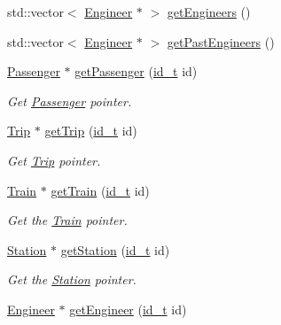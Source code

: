 \begin{DoxyCompactItemize}
std\+::vector$<$ \mbox{\hyperlink{classEngineer}{Engineer}} $\ast$ $>$ \mbox{\hyperlink{classSystem_a7c46ccdf8464941220f87c8c9c2b8920}{get\+Engineers}} ()
\item 
std\+::vector$<$ \mbox{\hyperlink{classEngineer}{Engineer}} $\ast$ $>$ \mbox{\hyperlink{classSystem_a2c7e714df1c7788f724cdfbd9eab3984}{get\+Past\+Engineers}} ()
\item 
\mbox{\hyperlink{classPassenger}{Passenger}} $\ast$ \mbox{\hyperlink{classSystem_a166d21a8b7c87bb6779420b77387fce6}{get\+Passenger}} (\mbox{\hyperlink{project__utils_8h_a8f3a969054ad2200720b96e7e23dd4e1}{id\+\_\+t}} id)
\begin{DoxyCompactList}\small\item\em Get \mbox{\hyperlink{classPassenger}{Passenger}} pointer. \end{DoxyCompactList}\item 
\mbox{\hyperlink{classTrip}{Trip}} $\ast$ \mbox{\hyperlink{classSystem_ac3c08260fc0dd63ad38df7a3e12bbea3}{get\+Trip}} (\mbox{\hyperlink{project__utils_8h_a8f3a969054ad2200720b96e7e23dd4e1}{id\+\_\+t}} id)
\begin{DoxyCompactList}\small\item\em Get \mbox{\hyperlink{classTrip}{Trip}} pointer. \end{DoxyCompactList}\item 
\mbox{\hyperlink{classTrain}{Train}} $\ast$ \mbox{\hyperlink{classSystem_aa7757a87f1cbcfbb4dcdf2c84c43e285}{get\+Train}} (\mbox{\hyperlink{project__utils_8h_a8f3a969054ad2200720b96e7e23dd4e1}{id\+\_\+t}} id)
\begin{DoxyCompactList}\small\item\em Get the \mbox{\hyperlink{classTrain}{Train}} pointer. \end{DoxyCompactList}\item 
\mbox{\hyperlink{classStation}{Station}} $\ast$ \mbox{\hyperlink{classSystem_a624e03523cf1e76d328211689c0d56bf}{get\+Station}} (\mbox{\hyperlink{project__utils_8h_a8f3a969054ad2200720b96e7e23dd4e1}{id\+\_\+t}} id)
\begin{DoxyCompactList}\small\item\em Get the \mbox{\hyperlink{classStation}{Station}} pointer. \end{DoxyCompactList}\item 
\mbox{\hyperlink{classEngineer}{Engineer}} $\ast$ \mbox{\hyperlink{classSystem_a6a707516000be8f8f1d67b2ba03a4995}{get\+Engineer}} (\mbox{\hyperlink{project__utils_8h_a8f3a969054ad2200720b96e7e23dd4e1}{id\+\_\+t}} id)
\item 

\end{DoxyCompactItemize}
